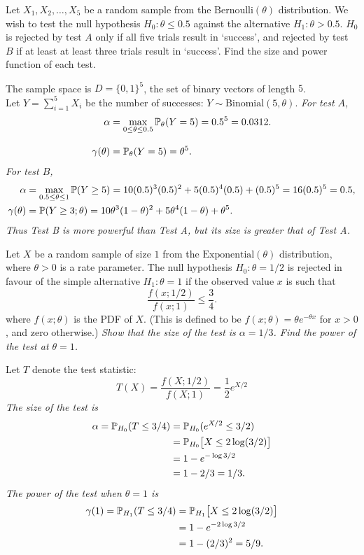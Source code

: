 \begin{exercise}
\begin{questions}
\question
Let $X_1,X_2,\ldots,X_5$ be a random sample from the $\text{Bernoulli}(\theta)$ distribution. We wish to test the null hypothesis $H_0:\theta\leq 0.5$ against the alternative $H_1:\theta> 0.5$. $H_0$ is rejected by test $A$ only if all five trials result in `success', and rejected by test $B$ if at least at least three trials result in `success'. Find the size and power function of each test.
\begin{answer}
The sample space is $D=\{0,1\}^5$, the set of binary vectors of length $5$. \\
Let $Y=\sum_{i=1}^5 X_i$ be the number of successes: $Y\sim\text{Binomial}(5,\theta)$.
\ben
\it For test $A$, 
\begin{align*}
\alpha 			& = \max_{0\leq\theta\leq 0.5}\mathbb{P}_{\theta}(Y=5) = 0.5^5 = 0.0312. \\[2ex]
\gamma(\theta)	& = \mathbb{P}_{\theta}(Y=5) = \theta^5.
\end{align*}
\it For test $B$, 
\begin{align*}
\alpha 			& = \max_{0.5\leq\theta\leq 1}\mathbb{P}(Y\geq 5) 
				= 10(0.5)^3(0.5)^2 + 5(0.5)^4(0.5) + (0.5)^5 = 16(0.5)^5 = 0.5, \\
\gamma(\theta)	& = \mathbb{P}(Y\geq 3;\theta) 
				= 10\theta^3(1-\theta)^2 + 5\theta^4(1-\theta) + \theta^5.
\end{align*}
Thus Test B is more powerful than Test A, but its size is greater that of Test A.
\een
\end{answer}

\question 
Let $X$ be a random sample of size $1$ from the $\text{Exponential}(\theta)$ distribution, where $\theta>0$ is a rate parameter. The null hypothesis $H_0:\theta=1/2$ is rejected in favour of the simple alternative $H_1:\theta = 1$ if the observed value $x$ is such that
\[
\frac{f(x;1/2)}{f(x;1)} \leq \frac{3}{4}.
\]
where $f(x;\theta)$ is the PDF of $X$. (This is defined to be $f(x;\theta) = \theta e^{-\theta x}$ for $x>0$, and zero otherwise.)
\ben
\it Show that the size of the test is $\alpha=1/3$.
\it Find the power of the test at $\theta=1$.
\een
\begin{answer}
Let $T$ denote the test statistic:
\[
T(X) = \frac{f(X;1/2)}{f(X;1)} = \frac{1}{2}e^{X/2}
\]
\ben
\it The size of the test is
\begin{align*}
\alpha = \mathbb{P}_{H_0}(T\leq 3/4)
	& = \mathbb{P}_{H_0}(e^{X/2} \leq 3/2) \\
	& = \mathbb{P}_{H_0}\big[X\leq 2\log(3/2)\big] \\
	& = 1 - e^{-\log 3/2} \\
	& = 1 - 2/3 = 1/3.
\end{align*}
\it The power of the test when $\theta=1$ is
\begin{align*}
\gamma(1) = \mathbb{P}_{H_1}(T\leq 3/4)
	& = \mathbb{P}_{H_1}\big[X\leq 2\log(3/2)\big] \\
	& = 1 - e^{-2\log 3/2} \\
	& = 1 - (2/3)^2 = 5/9.
\end{align*}
\een
\end{answer}
\end{questions}
\end{exercise}

